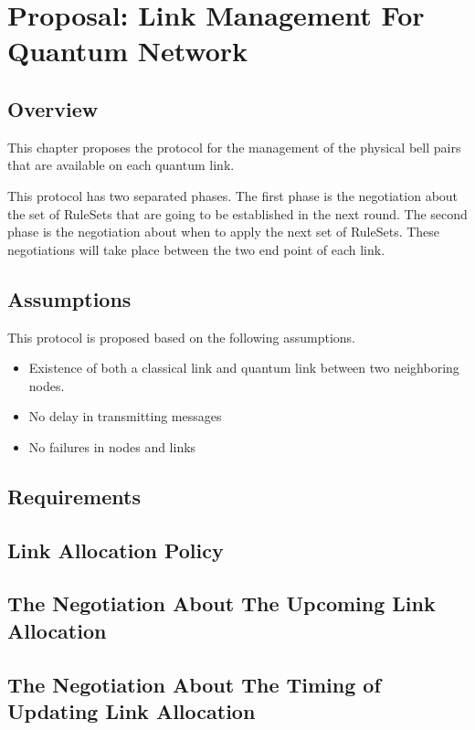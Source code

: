 \chapter{Proposal: Link Management For Quantum Network}
\label{proposal}

\section{Overview}

This chapter proposes the protocol for the management of the physical bell pairs that are available on each quantum link.

This protocol has two separated phases. The first phase is the negotiation about the set of RuleSets that are going to be established in the next round. The second phase is the negotiation about when to apply the next set of RuleSets.
These negotiations will take place between the two end point of each link.

\section{Assumptions}

This protocol is proposed based on the following assumptions.

\begin{itemize}
  \item Existence of both a classical link and quantum link between two neighboring nodes.
  \item No delay in transmitting messages 
  \item No failures in nodes and links
\end{itemize}

\section{Requirements}
\section{Link Allocation Policy}
\section{The Negotiation About The Upcoming Link Allocation}
\section{The Negotiation About The Timing of Updating Link Allocation}

